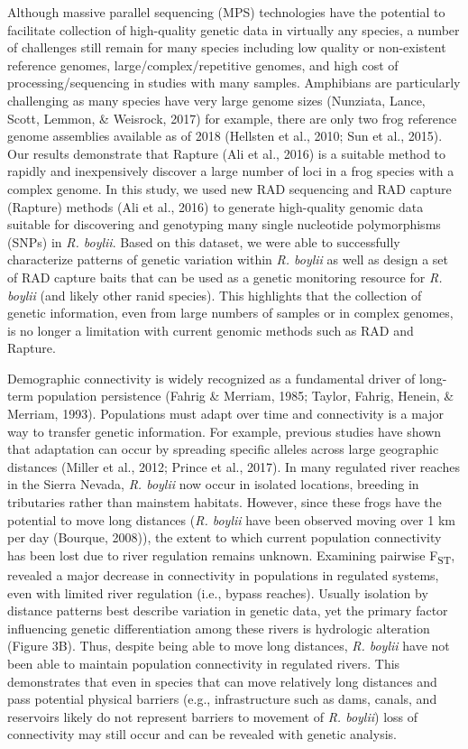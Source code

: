 \documentclass[proquest,12pt,final]{ucthesis-CA2012} %
\begin{document}
\begin{ucmainmatter}
Although massive parallel sequencing (MPS) technologies have the
potential to facilitate collection of high-quality genetic data in
virtually any species, a number of challenges still remain for many
species including low quality or non-existent reference genomes,
large/complex/repetitive genomes, and high cost of processing/sequencing
in studies with many samples. Amphibians are particularly challenging as
many species have very large genome sizes (Nunziata, Lance, Scott,
Lemmon, \& Weisrock, 2017) for example, there are only two frog
reference genome assemblies available as of 2018 (Hellsten et al., 2010;
Sun et al., 2015). Our results demonstrate that Rapture (Ali et al.,
2016) is a suitable method to rapidly and inexpensively discover a large
number of loci in a frog species with a complex genome. In this study,
we used new RAD sequencing and RAD capture (Rapture) methods (Ali et
al., 2016) to generate high-quality genomic data suitable for
discovering and genotyping many single nucleotide polymorphisms (SNPs)
in \emph{R. boylii}. Based on this dataset, we were able to successfully
characterize patterns of genetic variation within \emph{R. boylii} as
well as design a set of RAD capture baits that can be used as a genetic
monitoring resource for \emph{R. boylii} (and likely other ranid
species). This highlights that the collection of genetic information,
even from large numbers of samples or in complex genomes, is no longer a
limitation with current genomic methods such as RAD and Rapture.

Demographic connectivity is widely recognized as a fundamental driver of
long-term population persistence (Fahrig \& Merriam, 1985; Taylor,
Fahrig, Henein, \& Merriam, 1993). Populations must adapt over time and
connectivity is a major way to transfer genetic information. For
example, previous studies have shown that adaptation can occur by
spreading specific alleles across large geographic distances (Miller et
al., 2012; Prince et al., 2017). In many regulated river reaches in the
Sierra Nevada, \emph{R. boylii} now occur in isolated locations,
breeding in tributaries rather than mainstem habitats. However, since
these frogs have the potential to move long distances (\emph{R. boylii}
have been observed moving over 1 km per day (Bourque, 2008)), the extent
to which current population connectivity has been lost due to river
regulation remains unknown. Examining pairwise F\textsubscript{ST},
revealed a major decrease in connectivity in populations in regulated
systems, even with limited river regulation (i.e., bypass reaches).
Usually isolation by distance patterns best describe variation in
genetic data, yet the primary factor influencing genetic differentiation
among these rivers is hydrologic alteration (Figure 3B). Thus, despite
being able to move long distances, \emph{R. boylii} have not been able
to maintain population connectivity in regulated rivers. This
demonstrates that even in species that can move relatively long
distances and pass potential physical barriers (e.g., infrastructure
such as dams, canals, and reservoirs likely do not represent barriers to
movement of \emph{R. boylii}) loss of connectivity may still occur and
can be revealed with genetic analysis.


\end{ucmainmatter}
\end{document}
